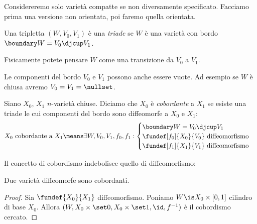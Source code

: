 

Considereremo solo varietà compatte se non diversamente specificato.
Facciamo prima una versione non orientata, poi faremo quella orientata.

\begin{defn}[Triade]
	Una tripletta $(W,V_0,V_1)$ è una \emph{triade} se $W$ è una varietà con bordo $\boundary W=V_0\djcup V_1$.
\end{defn}

Fisicamente potete pensare $W$ come una transizione da $V_0$ a $V_1$.

\begin{oss}
	Le componenti del bordo $V_0$ e $V_1$ possono anche essere vuote.
	Ad esempio se $W$ è chiusa avremo $V_0=V_1=\nullset$.
\end{oss}

\begin{defn}[Cobordismo]
	Siano $X_0$, $X_1$ $n$-varietà chiuse. Diciamo che $X_0$ è \emph{cobordante} a $X_1$ se esiste una triade le cui componenti del bordo sono diffeomorfe a $X_0$ e $X_1$:
	\[\text{$X_0$ cobordante a $X_1$}\means
	\exists W,V_0,V_1,f_0,f_1:\begin{cases}
		\boundary W=V_0\djcup V_1 \\
		\fundef[f_0]{X_0}{V_0}\text{ diffeomorfismo} \\
		\fundef[f_1]{X_1}{V_1}\text{ diffeomorfismo}
	\end{cases}\]
\end{defn}

\begin{center}
	
\end{center}

Il concetto di cobordismo indebolisce quello di diffeomorfismo:

\begin{prop}
	\label{th:diffcob}
	Due varietà diffeomorfe sono cobordanti.
\end{prop}

\begin{proof}
	Sia $\fundef{X_0}{X_1}$ diffeomorfismo.
	Poniamo $W\is X_0\times[0,1]$ cilindro di base $X_0$.
	Allora $(W,X_0\times\set0,X_0\times\set1,\id,f^{-1})$ è il cobordismo cercato.
\end{proof}

\begin{center}
	
\end{center}
	
